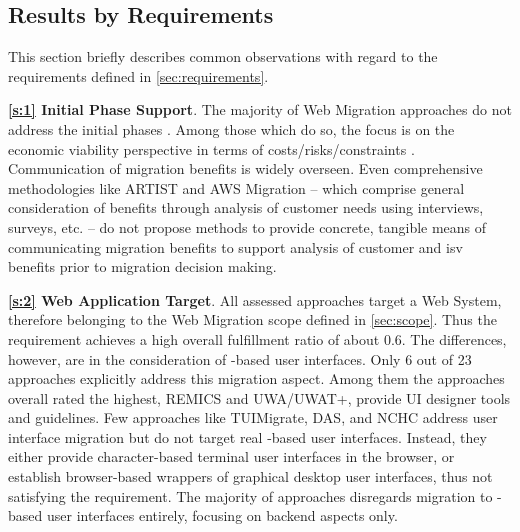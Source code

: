 \vspace{-30pt}
\hypertarget{sec:sota.discussion.requirements}{%
\subsection{Results by Requirements}\label{sec:sota.discussion.requirements}}
\vspace{10pt}

This section briefly describes common observations with regard to the requirements defined in \cref{sec:requirements}.

\textbf{\cref{s:1} Initial Phase Support}. The majority of \gls{Web Migration} approaches do not address the initial phases  \autocite[cf.~also][]{Heil2017Survey}.
Among those which do so, the focus is on the economic viability perspective \autocite{Khadka2011ServiciFi,Khadka2016PHD} in terms of costs/risks/constraints \autocite{Razavian2012}.
Communication of migration benefits is widely overseen.
Even comprehensive methodologies like ARTIST and AWS Migration -- which comprise general consideration of benefits through analysis of customer needs using interviews, surveys, etc.
-- do not propose methods to provide concrete, tangible means of communicating migration benefits to support analysis of customer and \gls{isv} benefits prior to migration decision making.

\textbf{\cref{s:2} Web Application Target}. All assessed approaches target a \gls{Web System}, therefore belonging to the \gls{Web Migration} scope defined in \cref{sec:scope}.
Thus the requirement achieves a high overall fulfillment ratio of about 0.6.
The differences, however, are in the consideration of -based user interfaces.
Only 6 out of 23 approaches explicitly address this migration aspect. Among them the approaches overall rated the highest, REMICS and UWA/UWAT+, provide UI designer tools and guidelines.
Few approaches like TUIMigrate, DAS, and NCHC address user interface migration but do not target real -based user interfaces.
Instead, they either provide character-based terminal user interfaces in the browser, or establish browser-based wrappers of graphical desktop user interfaces, thus not satisfying the requirement.
The majority of approaches disregards migration to -based user interfaces entirely, focusing on backend aspects only.

